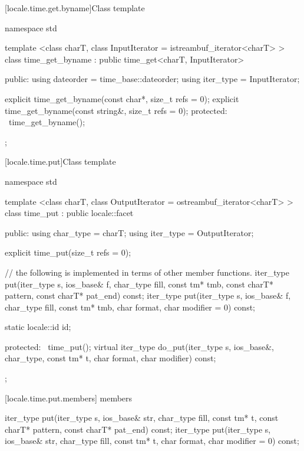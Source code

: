 [locale.time.get.byname]{Class template }

%
\begin{codeblock}
namespace std {
  template <class charT, class InputIterator = istreambuf_iterator<charT> >
  class time_get_byname : public time_get<charT, InputIterator> {
  public:
    using dateorder = time_base::dateorder;
    using iter_type = InputIterator;

    explicit time_get_byname(const char*, size_t refs = 0);
    explicit time_get_byname(const string&, size_t refs = 0);
  protected:
    ~time_get_byname();
  };
}
\end{codeblock}

[locale.time.put]{Class template }

%
\begin{codeblock}
namespace std {
  template <class charT, class OutputIterator = ostreambuf_iterator<charT> >
  class time_put : public locale::facet {
  public:
    using char_type = charT;
    using iter_type = OutputIterator;

    explicit time_put(size_t refs = 0);

    // the following is implemented in terms of other member functions.
    iter_type put(iter_type s, ios_base& f, char_type fill, const tm* tmb,
                  const charT* pattern, const charT* pat_end) const;
    iter_type put(iter_type s, ios_base& f, char_type fill,
                  const tm* tmb, char format, char modifier = 0) const;

    static locale::id id;

  protected:
    ~time_put();
    virtual iter_type do_put(iter_type s, ios_base&, char_type, const tm* t,
                             char format, char modifier) const;
  };
}
\end{codeblock}

[locale.time.put.members]{ members}

%
\begin{itemdecl}
iter_type put(iter_type s, ios_base& str, char_type fill, const tm* t,
              const charT* pattern, const charT* pat_end) const;
iter_type put(iter_type s, ios_base& str, char_type fill, const tm* t,
              char format, char modifier = 0) const;
\end{itemdecl}

